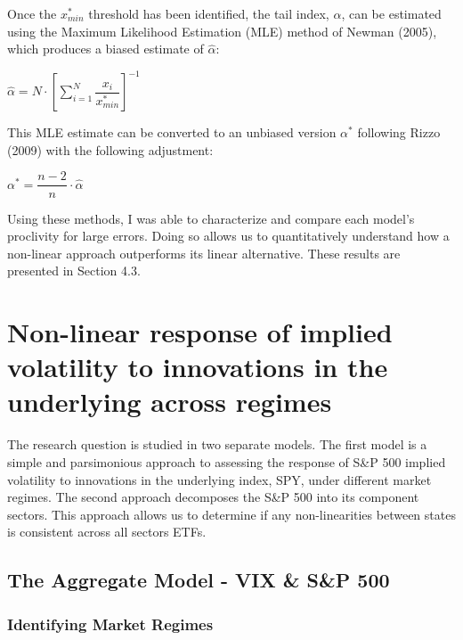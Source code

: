 \documentclass[11pt,a4paper,oldfontcommands]{memoir}
\begin{document}
{Once the $x_{min}^\ast$ threshold has been identified, the tail index, $\alpha$, can be estimated using the Maximum Likelihood Estimation (MLE) method of Newman (2005), which produces a biased estimate of $\hat{\alpha}$:

\begin{center}
$\hat{\alpha}= N\cdot [\sum_{i=1}^{N} \dfrac{x_i}{x_{min}^\ast}]^{-1}$
\end{center}

\begin{flushleft}

This MLE estimate can be converted to an unbiased version $\alpha^{\ast}$ following Rizzo (2009) with the following adjustment: 
\end{flushleft}

\begin{center}
$\alpha^{\ast}= \dfrac{{n-2}}{n}\cdot\hat{\alpha}$
\end{center}

Using these methods, I was able to characterize and compare each model's proclivity for large errors. Doing so allows us to quantitatively understand how a non-linear approach outperforms its linear alternative. These results are presented in Section 4.3.

\section{Non-linear response of implied volatility to innovations in the underlying across regimes}

The research question is studied in two separate models. The first model is a simple and parsimonious approach to assessing the response of S\&P 500 implied volatility to innovations in the underlying index, SPY, under different market regimes. The second approach decomposes the S\&P 500 into its component sectors. This approach allows us to determine if any non-linearities between states is consistent across all sectors ETFs.

\subsection{The Aggregate Model - VIX \& S\&P 500}

\subsubsection{Identifying Market Regimes}

}
\end{document}
